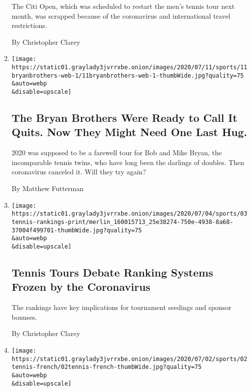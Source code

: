 \begin{enumerate}
  The Citi Open, which was scheduled to restart the men's tennis tour
  next month, was scrapped because of the coronavirus and international
  travel restrictions.

  By Christopher Clarey
\item
  \href{/2020/07/11/sports/tennis/Bryan-brothers.html}{}

  \texttt{[image: https://static01.graylady3jvrrxbe.onion/images/2020/07/11/sports/11bryanbrothers-web-1/11bryanbrothers-web-1-thumbWide.jpg?quality=75\\\&auto=webp\\\&disable=upscale]}

  \hypertarget{the-bryan-brothers-were-ready-to-call-it-quits-now-they-might-need-one-last-hug}{%
  \subsection{The Bryan Brothers Were Ready to Call It Quits. Now They
  Might Need One Last
  Hug.}\label{the-bryan-brothers-were-ready-to-call-it-quits-now-they-might-need-one-last-hug}}

  2020 was supposed to be a farewell tour for Bob and Mike Bryan, the
  incomparable tennis twins, who have long been the darlings of doubles.
  Then coronavirus canceled it. Will they try again?

  By Matthew Futterman
\item
  \href{/2020/07/04/sports/tennis/tennis-rankings-coronavirus.html}{}

  \texttt{[image: https://static01.graylady3jvrrxbe.onion/images/2020/07/04/sports/03tennis-rankings-print/merlin\_160015713\_25e38274-750e-4938-8a68-37004f499701-thumbWide.jpg?quality=75\\\&auto=webp\\\&disable=upscale]}

  \hypertarget{tennis-tours-debate-ranking-systems-frozen-by-the-coronavirus}{%
  \subsection{Tennis Tours Debate Ranking Systems Frozen by the
  Coronavirus}\label{tennis-tours-debate-ranking-systems-frozen-by-the-coronavirus}}

  The rankings have key implications for tournament seedings and sponsor
  bonuses.

  By Christopher Clarey
\item
  \href{/2020/07/02/sports/tennis/french-open-fans.html}{}

  \texttt{[image: https://static01.graylady3jvrrxbe.onion/images/2020/07/02/sports/02tennis-french/02tennis-french-thumbWide.jpg?quality=75\\\&auto=webp\\\&disable=upscale]}


\end{enumerate}
